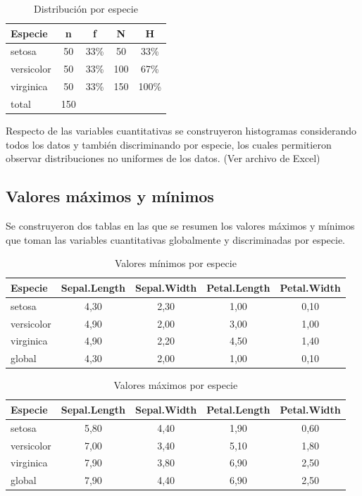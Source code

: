 \documentclass[12pt,a4paper]{article}
\begin{document}
\begin{table}[h!]
\centering
\caption{Distribución por especie}
\label{fig:distribucion}
\begin{tabular}{lcccc}
\toprule
\textbf{Especie} & \textbf{n} & \textbf{f} & \textbf{N} & \textbf{H} \\
\midrule
setosa     & 50  & 33\% & 50  & 33\%  \\
versicolor & 50  & 33\% & 100 & 67\%  \\
virginica  & 50  & 33\% & 150 & 100\% \\
\midrule
total      & 150 &      &     &       \\
\bottomrule
\end{tabular}
\end{table}

Respecto de las variables cuantitativas se construyeron histogramas considerando todos los datos y también discriminando por especie, los cuales permitieron observar distribuciones no uniformes de los datos. (Ver archivo de Excel)

\subsection{Valores máximos y mínimos}

Se construyeron dos tablas en las que se resumen los valores máximos y mínimos que toman las variables cuantitativas globalmente y discriminadas por especie.

\begin{table}[h!]
\centering
\caption{Valores mínimos por especie}
\label{fig:minimos}
\begin{tabular}{lcccc}
\toprule
\textbf{Especie} & \textbf{Sepal.Length} & \textbf{Sepal.Width} & \textbf{Petal.Length} & \textbf{Petal.Width} \\
\midrule
setosa     & 4,30 & 2,30 & 1,00 & 0,10 \\
versicolor & 4,90 & 2,00 & 3,00 & 1,00 \\
virginica  & 4,90 & 2,20 & 4,50 & 1,40 \\
global     & 4,30 & 2,00 & 1,00 & 0,10 \\
\bottomrule
\end{tabular}
\end{table}

\begin{table}[h!]
\centering
\caption{Valores máximos por especie}
\label{fig:maximos}
\begin{tabular}{lcccc}
\toprule
\textbf{Especie} & \textbf{Sepal.Length} & \textbf{Sepal.Width} & \textbf{Petal.Length} & \textbf{Petal.Width} \\
\midrule
setosa     & 5,80 & 4,40 & 1,90 & 0,60 \\
versicolor & 7,00 & 3,40 & 5,10 & 1,80 \\
virginica  & 7,90 & 3,80 & 6,90 & 2,50 \\
global     & 7,90 & 4,40 & 6,90 & 2,50 \\
\bottomrule
\end{tabular}
\end{table}
\end{document}
